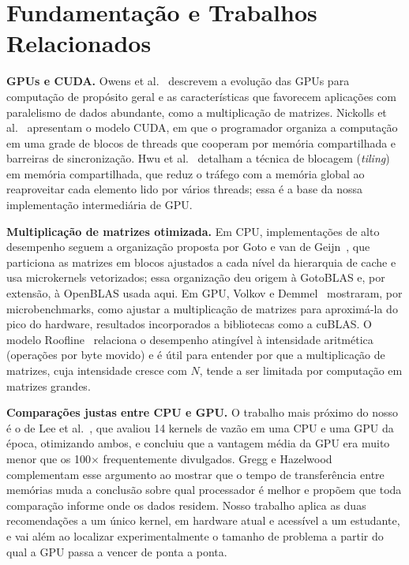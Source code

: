 \documentclass[12pt]{article}
\begin{document}
\section{Fundamentação e Trabalhos Relacionados}\label{sec:relacionados}

\textbf{GPUs e CUDA.} Owens et al.~\cite{owens2008} descrevem a
evolução das GPUs para computação de propósito geral e as características
que favorecem aplicações com paralelismo de dados abundante, como a
multiplicação de matrizes. Nickolls et al.~\cite{nickolls2008}
apresentam o modelo CUDA, em que o programador organiza a computação em uma
grade de blocos de threads que cooperam por memória compartilhada e barreiras
de sincronização. Hwu et al.~\cite{hwu2022} detalham a técnica de
blocagem (\emph{tiling}) em memória compartilhada, que reduz o tráfego com a
memória global ao reaproveitar cada elemento lido por vários threads; essa é a
base da nossa implementação intermediária de GPU.

\textbf{Multiplicação de matrizes otimizada.} Em CPU, implementações de alto
desempenho seguem a organização proposta por
Goto e van de Geijn~\cite{goto2008}, que particiona as matrizes em blocos
ajustados a cada nível da hierarquia de cache e usa microkernels vetorizados;
essa organização deu origem à GotoBLAS e, por extensão, à OpenBLAS usada aqui.
Em GPU, Volkov e Demmel~\cite{volkov2008} mostraram, por
microbenchmarks, como ajustar a multiplicação de matrizes para aproximá-la do
pico do hardware, resultados incorporados a bibliotecas como a cuBLAS. O
modelo Roofline~\cite{williams2009} relaciona o desempenho atingível à
intensidade aritmética (operações por byte movido) e é útil para entender por
que a multiplicação de matrizes, cuja intensidade cresce com $N$, tende a ser
limitada por computação em matrizes grandes.

\textbf{Comparações justas entre CPU e GPU.} O trabalho mais próximo do nosso é
o de Lee et al.~\cite{lee2010}, que avaliou 14 kernels de vazão em
uma CPU e uma GPU da época, otimizando ambos, e concluiu que a vantagem média
da GPU era muito menor que os 100$\times$ frequentemente divulgados.
Gregg e Hazelwood~\cite{gregg2011} complementam esse argumento ao
mostrar que o tempo de transferência entre memórias muda a conclusão sobre qual
processador é melhor e propõem que toda comparação informe onde os dados
residem. Nosso trabalho aplica as duas recomendações a um único kernel, em
hardware atual e acessível a um estudante, e vai além ao localizar
experimentalmente o tamanho de problema a partir do qual a GPU passa a vencer
de ponta a ponta.
\end{document}
